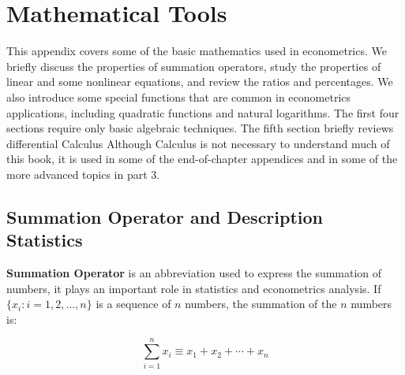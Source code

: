 \documentclass[11pt,bibtex]{elegantbook}
\begin{document}
\nocite{*}

\printbibliography[heading=bibintoc, title=\ebibname]
\appendix


\chapter{Mathematical Tools}

This \cite{en1} appendix covers some of the basic mathematics used in econometrics. We briefly discuss the properties of summation operators, study the properties of linear and some nonlinear equations, and review the ratios and percentages. We also introduce some special functions that are common in econometrics applications, including quadratic functions and natural logarithms. The first four sections require only basic algebraic techniques. The fifth section briefly reviews differential Calculus Although Calculus is not necessary to understand much of this book, it is used in some of the end-of-chapter appendices and in some of the more advanced topics in part 3.

\section{Summation Operator and Description Statistics}

\textbf{Summation Operator} is an abbreviation used to express the summation of numbers, it plays an important role in statistics and econometrics analysis. If $\{x_i: i=1, 2, \ldots, n\}$ is a sequence of $n$ numbers, the summation of the $n$ numbers is:

\begin{equation}
\sum_{i=1}^n x_i \equiv x_1 + x_2 +\cdots + x_n
\end{equation}
\end{document}
